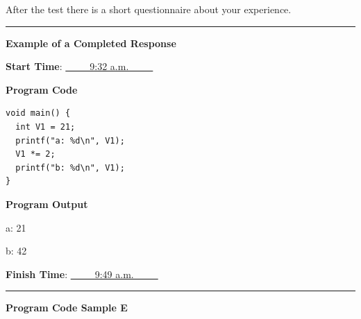 \documentclass[12pt, a4paper, oneside]{article}
\begin{document}
After the test there is a short questionnaire about your experience.

\begin{center}\rule{0.8\linewidth}{2pt}\end{center}


\textbf{Example of a Completed Response}

\vspace{10pt}

\textbf{Start Time}: \underline{~~~~~9:32 a.m.~~~~~}

\vspace{10pt}

\textbf{Program Code}

\begin{lstlisting}
void main() {
  int V1 = 21;
  printf("a: %d\n", V1);
  V1 *= 2;
  printf("b: %d\n", V1);
}
\end{lstlisting}

\textbf{Program Output}

a: 21

b: 42

\textbf{Finish Time}: \underline{~~~~~9:49 a.m.~~~~~}

\begin{center}\rule{0.8\linewidth}{2pt}\end{center}

  \pagebreak


\textbf{Program Code Sample E}

\vspace{20pt}


\end{document}
